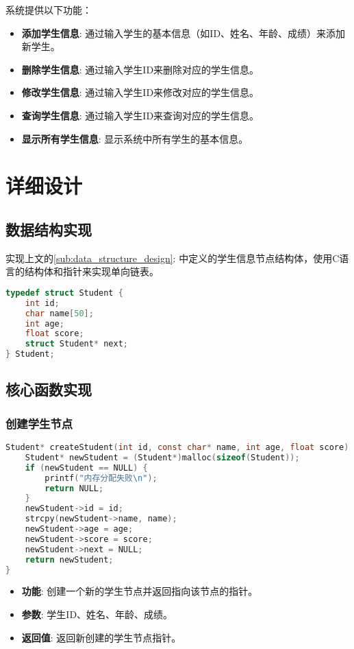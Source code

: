 系统提供以下功能：
\begin{itemize}
    \item \textbf{添加学生信息}: 通过输入学生的基本信息（如ID、姓名、年龄、成绩）来添加新学生。
    \item \textbf{删除学生信息}: 通过输入学生ID来删除对应的学生信息。
    \item \textbf{修改学生信息}: 通过输入学生ID来修改对应的学生信息。
    \item \textbf{查询学生信息}: 通过输入学生ID来查询对应的学生信息。
    \item \textbf{显示所有学生信息}: 显示系统中所有学生的基本信息。
\end{itemize}

\section{详细设计}

\subsection{数据结构实现}

实现上文的\ref{sub:data_structure_design}: 中定义的学生信息节点结构体，使用C语言的结构体和指针来实现单向链表。

\begin{lstlisting}[language=C, caption=学生信息节点结构体]
typedef struct Student {
    int id;
    char name[50];
    int age;
    float score;
    struct Student* next;
} Student;
\end{lstlisting}

\subsection{核心函数实现}

\subsubsection{创建学生节点}
\begin{lstlisting}[language=C, caption=创建学生节点函数]
Student* createStudent(int id, const char* name, int age, float score) {
    Student* newStudent = (Student*)malloc(sizeof(Student));
    if (newStudent == NULL) {
        printf("内存分配失败\n");
        return NULL;
    }
    newStudent->id = id;
    strcpy(newStudent->name, name);
    newStudent->age = age;
    newStudent->score = score;
    newStudent->next = NULL;
    return newStudent;
}
\end{lstlisting}

\begin{itemize}
    \item \textbf{\textcolor{mydeepgreen}{功能}}: 创建一个新的学生节点并返回指向该节点的指针。
    \item \textbf{\textcolor{mydeepgreen}{参数}}: 学生ID、姓名、年龄、成绩。
    \item \textbf{\textcolor{mydeepgreen}{返回值}}: 返回新创建的学生节点指针。
\end{itemize}
